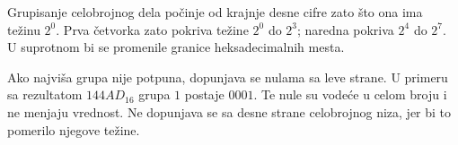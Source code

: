 
Grupisanje celobrojnog dela počinje od krajnje desne cifre zato što ona ima težinu $2^0$. Prva četvorka zato pokriva težine $2^0$ do $2^3$; naredna pokriva $2^4$ do $2^7$. U suprotnom bi se promenile granice heksadecimalnih mesta.

Ako najviša grupa nije potpuna, dopunjava se nulama sa leve strane. U primeru sa rezultatom $144AD_{16}$ grupa $1$ postaje $0001$. Te nule su vodeće u celom broju i ne menjaju vrednost. Ne dopunjava se sa desne strane celobrojnog niza, jer bi to pomerilo njegove težine.
